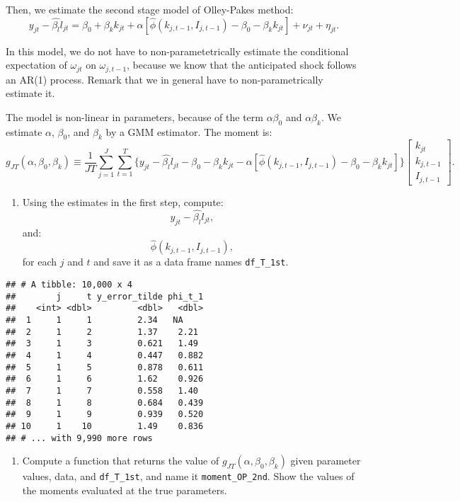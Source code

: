 \documentclass[
]{book}
\providecommand{\tightlist}{%
  \setlength{\itemsep}{0pt}\setlength{\parskip}{0pt}}
\begin{document}
Then, we estimate the second stage model of Olley-Pakes method:
\[
y_{jt} - \hat{\beta_l} l_{jt} = \beta_0 + \beta_k k_{jt} + \alpha[\hat{\phi}(k_{j, t - 1}, I_{j, t - 1}) - \beta_0 - \beta_k k_{jt}] + \nu_{jt} + \eta_{jt}.
\]

In this model, we do not have to non-parametetrically estimate the conditional expectation of \(\omega_{jt}\) on \(\omega_{j, t - 1}\), because we know that the anticipated shock follows an AR(1) process. Remark that we in general have to non-parametrically estimate it.

The model is non-linear in parameters, because of the term \(\alpha \beta_0\) and \(\alpha \beta_k\). We estimate \(\alpha\), \(\beta_0\), and \(\beta_k\) by a GMM estimator. The moment is:
\[
g_{JT}(\alpha, \beta_0, \beta_k) \equiv \frac{1}{JT}\sum_{j = 1}^J \sum_{t = 1}^T \{y_{jt} - \hat{\beta_l} l_{jt} - \beta_0 - \beta_k k_{jt} - \alpha[\hat{\phi}(k_{j, t - 1}, I_{j, t - 1}) - \beta_0 - \beta_k k_{jt}]\} 
\begin{bmatrix}
k_{jt} \\
k_{j, t - 1} \\
I_{j, t - 1}
\end{bmatrix}.
\]

\begin{enumerate}
\def\labelenumi{\arabic{enumi}.}
\setcounter{enumi}{4}
\tightlist
\item
  Using the estimates in the first step, compute:
  \[
  y_{jt} - \hat{\beta_l} l_{jt},
  \]
  and:
  \[
  \hat{\phi}(k_{j, t - 1}, I_{j, t - 1}),
  \]
  for each \(j\) and \(t\) and save it as a data frame names \texttt{df\_T\_1st}.
\end{enumerate}

\begin{verbatim}
## # A tibble: 10,000 x 4
##        j     t y_error_tilde phi_t_1
##    <int> <dbl>         <dbl>   <dbl>
##  1     1     1         2.34   NA    
##  2     1     2         1.37    2.21 
##  3     1     3         0.621   1.49 
##  4     1     4         0.447   0.882
##  5     1     5         0.878   0.611
##  6     1     6         1.62    0.926
##  7     1     7         0.558   1.40 
##  8     1     8         0.684   0.439
##  9     1     9         0.939   0.520
## 10     1    10         1.49    0.836
## # ... with 9,990 more rows
\end{verbatim}

\begin{enumerate}
\def\labelenumi{\arabic{enumi}.}
\setcounter{enumi}{5}
\tightlist
\item
  Compute a function that returns the value of \(g_{JT}(\alpha, \beta_0, \beta_k)\) given parameter values, data, and \texttt{df\_T\_1st}, and name it \texttt{moment\_OP\_2nd}. Show the values of the moments evaluated at the true parameters.
\end{enumerate}
\end{document}

